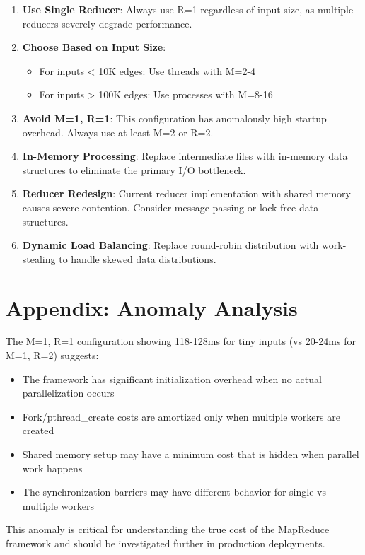 \documentclass[11pt]{article}
\begin{document}
\begin{enumerate}
    \item \textbf{Use Single Reducer}: Always use R=1 regardless of input size, as multiple reducers severely degrade performance.
    
    \item \textbf{Choose Based on Input Size}: 
    \begin{itemize}
        \item For inputs < 10K edges: Use threads with M=2-4
        \item For inputs > 100K edges: Use processes with M=8-16
    \end{itemize}
    
    \item \textbf{Avoid M=1, R=1}: This configuration has anomalously high startup overhead. Always use at least M=2 or R=2.
    
    \item \textbf{In-Memory Processing}: Replace intermediate files with in-memory data structures to eliminate the primary I/O bottleneck.
    
    \item \textbf{Reducer Redesign}: Current reducer implementation with shared memory causes severe contention. Consider message-passing or lock-free data structures.
    
    \item \textbf{Dynamic Load Balancing}: Replace round-robin distribution with work-stealing to handle skewed data distributions.
\end{enumerate}

\section{Appendix: Anomaly Analysis}

The M=1, R=1 configuration showing 118-128ms for tiny inputs (vs 20-24ms for M=1, R=2) suggests:
\begin{itemize}
    \item The framework has significant initialization overhead when no actual parallelization occurs
    \item Fork/pthread\_create costs are amortized only when multiple workers are created
    \item Shared memory setup may have a minimum cost that is hidden when parallel work happens
    \item The synchronization barriers may have different behavior for single vs multiple workers
\end{itemize}

This anomaly is critical for understanding the true cost of the MapReduce framework and should be investigated further in production deployments.
\end{document}
